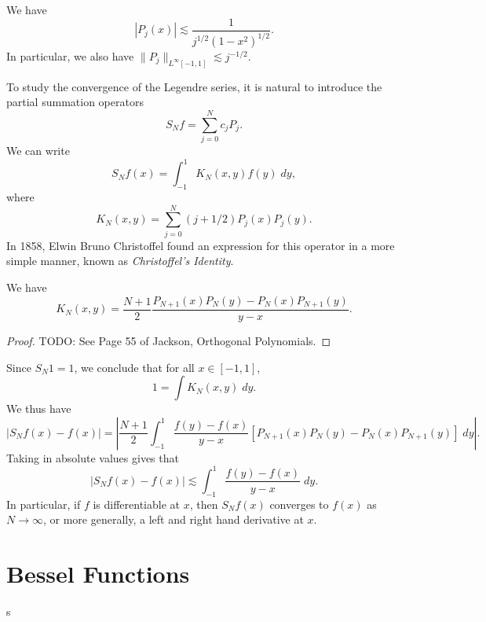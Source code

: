 \begin{theorem}
    We have
    \[ |P_j(x)| \lesssim \frac{1}{j^{1/2} (1 - x^2)^{1/2}}. \]
    In particular, we also have $\| P_j \|_{L^\infty[-1,1]} \lesssim j^{-1/2}$.
\end{theorem}

To study the convergence of the Legendre series, it is natural to introduce the partial summation operators
%
\[ S_N f = \sum_{j = 0}^N c_j P_j. \]
%
We can write
%
\[ S_N f(x) = \int_{-1}^1 K_N(x,y) f(y)\; dy, \]
%
where
%
\[ K_N(x,y) = \sum_{j = 0}^N (j + 1/2) P_j(x) P_j(y). \]
%
In 1858, Elwin Bruno Christoffel found an expression for this operator in a more simple manner, known as \emph{Christoffel's Identity}.

\begin{theorem}
    We have
    \[ K_N(x,y) = \frac{N+1}{2} \frac{P_{N+1}(x) P_N(y) - P_N(x) P_{N+1}(y)}{y - x}. \]
\end{theorem}
\begin{proof}
    TODO: See Page 55 of Jackson, Orthogonal Polynomials.
\end{proof}

Since $S_N 1 = 1$, we conclude that for all $x \in [-1,1]$,
%
\[ 1 = \int K_N(x,y)\; dy. \]
%
We thus have
%
\[ |S_N f(x) - f(x)| = \left| \frac{N+1}{2} \int_{-1}^1 \frac{f(y) - f(x)}{y - x} [ P_{N+1}(x) P_N(y) - P_N(x) P_{N+1}(y) ]\; dy \right|. \]
%
Taking in absolute values gives that
%
\[ |S_N f(x) - f(x)| \lesssim \int_{-1}^1 \frac{f(y) - f(x)}{y - x}\; dy. \]
%
In particular, if $f$ is differentiable at $x$, then $S_N f(x)$ converges to $f(x)$ as $N \to \infty$, or more generally, a left and right hand derivative at $x$.







\section{Bessel Functions}

s




















